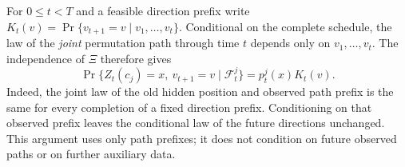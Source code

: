 For $0\le t<T$ and a feasible direction prefix write
$K_t(v)=\Pr\{v_{t+1}=v\mid v_1,\ldots,v_t\}$. Conditional on the
complete schedule, the law of the \emph{joint} permutation path
through time $t$ depends only on $v_1,\ldots,v_t$. The independence
of $\Xi$ therefore gives
\begin{equation}\label{eq:marginal-direction-factorization}
 \Pr\{Z_t(c_j)=x,\ v_{t+1}=v\mid\mathcal F_t^j\}
 =p_t^j(x)K_t(v).
\end{equation}
Indeed, the joint law of the old hidden position and observed path
prefix is the same for every completion of a fixed direction
prefix. Conditioning on that observed prefix leaves the
conditional law of the future directions unchanged. This argument
uses only path prefixes; it does not condition on future observed
paths or on further auxiliary data.

